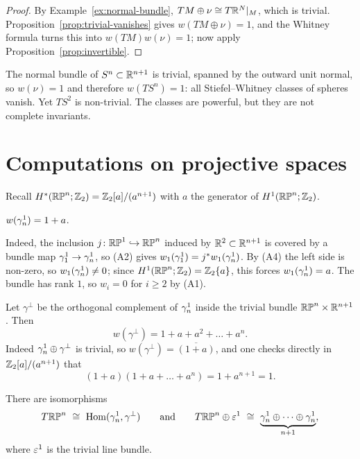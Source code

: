 \begin{proof}
By Example~\ref{ex:normal-bundle}, $TM\oplus\nu\cong T\mathbb{R}^N|_M$, which is trivial.
Proposition~\ref{prop:trivial-vanishes} gives $w(TM\oplus\nu)=1$, and the
Whitney formula turns this into $w(TM)w(\nu)=1$; now apply
Proposition~\ref{prop:invertible}.
\end{proof}

\begin{example}
The normal bundle of $S^n\subset\mathbb{R}^{n+1}$ is trivial, spanned by the outward
unit normal, so $w(\nu)=1$ and therefore $w(TS^n)=1$: all Stiefel--Whitney
classes of spheres vanish. Yet $TS^2$ is non-trivial. The classes are powerful,
but they are not complete invariants.
\end{example}

\section{Computations on projective spaces}

Recall $H^*(\mathbb{RP}^n;\mathbb{Z}_2)=\mathbb{Z}_2[a]/(a^{n+1})$ with $a$ the generator of
$H^1(\mathbb{RP}^n;\mathbb{Z}_2)$.

\begin{example}\label{ex:w-gamma}
$w(\gamma^1_n)=1+a$.

Indeed, the inclusion $j\colon\mathbb{RP}^1\hookrightarrow\mathbb{RP}^n$ induced by
$\mathbb{R}^2\subset\mathbb{R}^{n+1}$ is covered by a bundle map
$\gamma^1_1\to\gamma^1_n$, so (A2) gives $w_1(\gamma^1_1)=j^*w_1(\gamma^1_n)$. By (A4)
the left side is non-zero, so $w_1(\gamma^1_n)\neq0$; since
$H^1(\mathbb{RP}^n;\mathbb{Z}_2)=\mathbb{Z}_2\{a\}$, this forces $w_1(\gamma^1_n)=a$. The bundle has rank
$1$, so $w_i=0$ for $i\ge2$ by (A1).
\end{example}

\begin{example}\label{ex:w-gamma-perp}
Let $\gamma^\perp$ be the orthogonal complement of $\gamma^1_n$ inside the trivial
bundle $\mathbb{RP}^n\times\mathbb{R}^{n+1}$. Then
\[
w(\gamma^\perp)=1+a+a^2+\dots+a^n .
\]
Indeed $\gamma^1_n\oplus\gamma^\perp$ is trivial, so
$w(\gamma^\perp)=\overline{(1+a)}$, and one checks directly in
$\mathbb{Z}_2[a]/(a^{n+1})$ that
\[
(1+a)(1+a+\dots+a^n)=1+a^{n+1}=1 .
\]
\end{example}

\begin{lemma}\label{lem:TRPn}
There are isomorphisms
\[
T\mathbb{RP}^n\ \cong\ \operatorname{Hom}(\gamma^1_n,\gamma^\perp)
\qquad\text{and}\qquad
T\mathbb{RP}^n\oplus\varepsilon^1\ \cong\
\underbrace{\gamma^1_n\oplus\dots\oplus\gamma^1_n}_{n+1},
\]
where $\varepsilon^1$ is the trivial line bundle.
\end{lemma}

